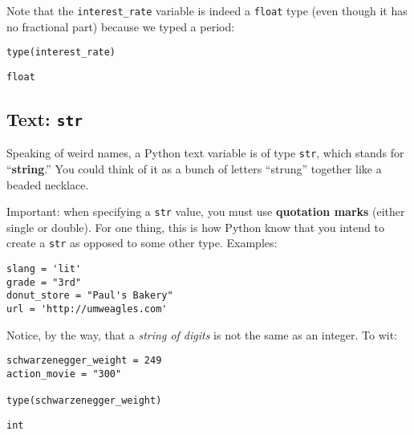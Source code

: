 Note that the \texttt{interest\_rate} variable is indeed a \texttt{float} type
(even though it has no fractional part) because we typed a period:

\begin{Verbatim}[fontsize=\small,samepage=true,frame=single,framesep=3mm]
type(interest_rate)
\end{Verbatim}
\vspace{-.15in}
\begin{Verbatim}[fontsize=\small,samepage=true,frame=leftline,framesep=5mm,framerule=1mm]
float
\end{Verbatim}

\subsection{Text: \texttt{str}}

Speaking of weird names, a Python text variable is of type \texttt{str}, which
stands for ``\textbf{string}.'' You could think of it as a bunch of letters
``strung'' together like a beaded necklace.

Important: when specifying a \texttt{str} value, you must use \textbf{quotation
marks} (either single or double). For one thing, this is how Python know that
you intend to create a \texttt{str} as opposed to some other type. Examples:

\begin{Verbatim}[fontsize=\small,samepage=true,frame=single,framesep=3mm]
slang = 'lit'
grade = "3rd"
donut_store = "Paul's Bakery"
url = 'http://umweagles.com'
\end{Verbatim}

Notice, by the way, that a \textit{string of digits} is not the same as an
integer. To wit:

\vspace{-.15in}
\begin{Verbatim}[fontsize=\small,samepage=true,frame=single,framesep=3mm]
schwarzenegger_weight = 249
action_movie = "300"

type(schwarzenegger_weight)
\end{Verbatim}
\vspace{-.15in}
\begin{Verbatim}[fontsize=\small,samepage=true,frame=leftline,framesep=5mm,framerule=1mm]
int
\end{Verbatim}
\vspace{-.15in}

